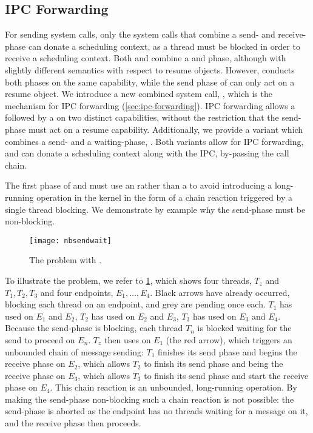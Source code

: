 \subsection{IPC Forwarding}
\label{s:ipc-forwarding}

For sending system calls, only the system calls that combine a send- and receive-phase can donate
a scheduling context, as a thread must be blocked in order to receive a scheduling context. Both
\call and \replyrecv combine a \send and \recv phase, although with slightly different semantics
with respect to resume objects. However, \call conducts both phases on the same capability, while
the send phase of \replyrecv can only act on a resume object. We introduce a new combined system
call, \nbsendrecv, which is the mechanism for IPC forwarding (\cref{sec:ipc-forwarding}). 
IPC forwarding allows a \nbsend followed by a \recv on two distinct capabilities, without the
restriction that the send-phase must act on a resume capability. 
Additionally, we provide a variant which combines a send- and a waiting-phase, \nbsendwait.
Both variants allow for IPC forwarding, and can donate a scheduling context
along with the IPC, by-passing the call chain. 

The first phase of \nbsendrecv and \nbsendwait must use an \nbsend rather than a \send
to avoid introducing a long-running operation in the kernel in the form of a chain reaction
triggered by a single thread blocking. We demonstrate by example why the send-phase must be
non-blocking.

\begin{figure}
    \texttt{[image: nbsendwait]}
    \caption{The problem with \sendrecv.}
    \label{fig:send-wait}
\end{figure}

To illustrate the problem, we refer to \cref{fig:send-wait}, which shows four threads, $T_{z}$ and
$T_{1},T_{2},T_{3}$ and four endpoints, $E_{1},\dots,E_{4}$. Black arrows have already
occurred, blocking each thread on an endpoint, and grey are pending once each. $T_{1}$ has used \sendrecv on
$E_{1}$ and $E_{2}$, $T_{2}$ has used \sendrecv on $E_{2}$ and $E_{3}$,  
$T_{3}$ has used \sendrecv on $E_{3}$ and $E_{4}$. 
Because the send-phase is blocking, each thread $T_{n}$ is blocked waiting for the send to proceed 
on $E_{n}$. $T_{z}$ then uses \recv on $E_{1}$ (the red arrow), which triggers an unbounded chain of message
sending: $T_{1}$ finishes its send phase and begins the receive phase on $E_{2}$, which allows
$T_{2}$ to finish its send phase and being the receive phase on $E_{3}$, which allows $T_{3}$ to
finish its send phase and start the receive phase on $E_{4}$. This chain reaction is an
unbounded, long-running operation. By making the send-phase non-blocking such a chain reaction is not
possible: the send-phase is aborted as the endpoint has no threads waiting for a message on it, and
the receive phase then proceeds. 

